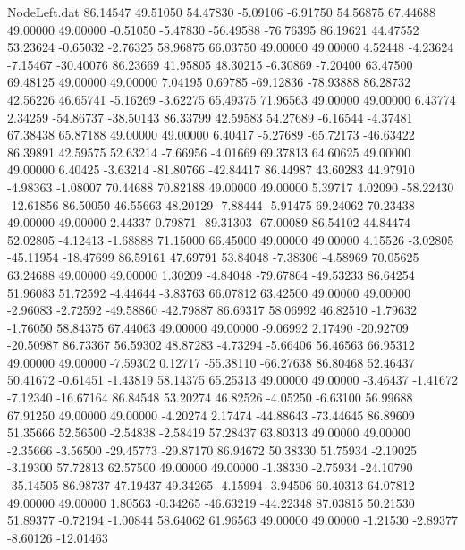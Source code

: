 \begin{filecontents}{NodeLeft.dat}
  86.14547   49.51050   54.47830    -5.09106   -6.91750   54.56875   67.44688   49.00000   49.00000   -0.51050   -5.47830  -56.49588  -76.76395
  86.19621   44.47552   53.23624    -0.65032   -2.76325   58.96875   66.03750   49.00000   49.00000    4.52448   -4.23624   -7.15467  -30.40076
  86.23669   41.95805   48.30215    -6.30869   -7.20400   63.47500   69.48125   49.00000   49.00000    7.04195    0.69785  -69.12836  -78.93888
  86.28732   42.56226   46.65741    -5.16269   -3.62275   65.49375   71.96563   49.00000   49.00000    6.43774    2.34259  -54.86737  -38.50143
  86.33799   42.59583   54.27689    -6.16544   -4.37481   67.38438   65.87188   49.00000   49.00000    6.40417   -5.27689  -65.72173  -46.63422
  86.39891   42.59575   52.63214    -7.66956   -4.01669   69.37813   64.60625   49.00000   49.00000    6.40425   -3.63214  -81.80766  -42.84417
  86.44987   43.60283   44.97910    -4.98363   -1.08007   70.44688   70.82188   49.00000   49.00000    5.39717    4.02090  -58.22430  -12.61856
  86.50050   46.55663   48.20129    -7.88444   -5.91475   69.24062   70.23438   49.00000   49.00000    2.44337    0.79871  -89.31303  -67.00089
  86.54102   44.84474   52.02805    -4.12413   -1.68888   71.15000   66.45000   49.00000   49.00000    4.15526   -3.02805  -45.11954  -18.47699
  86.59161   47.69791   53.84048    -7.38306   -4.58969   70.05625   63.24688   49.00000   49.00000    1.30209   -4.84048  -79.67864  -49.53233
  86.64254   51.96083   51.72592    -4.44644   -3.83763   66.07812   63.42500   49.00000   49.00000   -2.96083   -2.72592  -49.58860  -42.79887
  86.69317   58.06992   46.82510    -1.79632   -1.76050   58.84375   67.44063   49.00000   49.00000   -9.06992    2.17490  -20.92709  -20.50987
  86.73367   56.59302   48.87283    -4.73294   -5.66406   56.46563   66.95312   49.00000   49.00000   -7.59302    0.12717  -55.38110  -66.27638
  86.80468   52.46437   50.41672    -0.61451   -1.43819   58.14375   65.25313   49.00000   49.00000   -3.46437   -1.41672   -7.12340  -16.67164
  86.84548   53.20274   46.82526    -4.05250   -6.63100   56.99688   67.91250   49.00000   49.00000   -4.20274    2.17474  -44.88643  -73.44645
  86.89609   51.35666   52.56500    -2.54838   -2.58419   57.28437   63.80313   49.00000   49.00000   -2.35666   -3.56500  -29.45773  -29.87170
  86.94672   50.38330   51.75934    -2.19025   -3.19300   57.72813   62.57500   49.00000   49.00000   -1.38330   -2.75934  -24.10790  -35.14505
  86.98737   47.19437   49.34265    -4.15994   -3.94506   60.40313   64.07812   49.00000   49.00000    1.80563   -0.34265  -46.63219  -44.22348
  87.03815   50.21530   51.89377    -0.72194   -1.00844   58.64062   61.96563   49.00000   49.00000   -1.21530   -2.89377   -8.60126  -12.01463

\end{filecontents}
